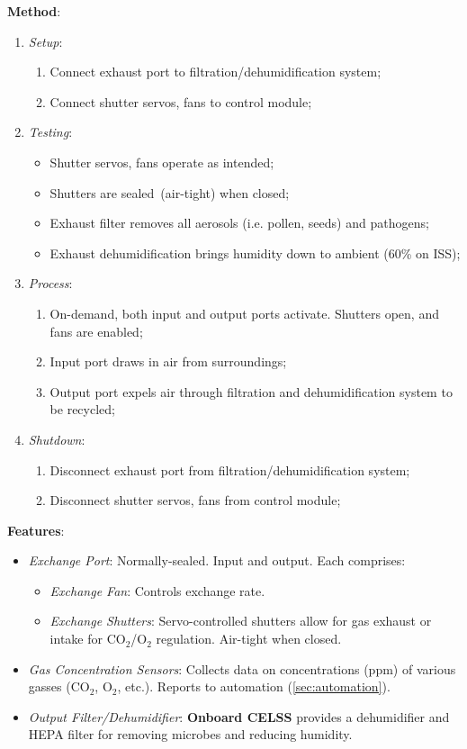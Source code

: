 \documentclass{report}
\begin{document}
\textbf{Method}:
\begin{enumerate}
    \item \textit{Setup}:
    \begin{enumerate}
        \item Connect exhaust port to filtration/dehumidification system;
        \item Connect shutter servos, fans to control module;
    \end{enumerate}
    \item \textit{Testing}:
    \begin{itemize}
        \item Shutter servos, fans operate as intended;
        \item Shutters are sealed (air-tight) when closed;
        \item Exhaust filter removes all aerosols (i.e. pollen, seeds) and pathogens;
        \item Exhaust dehumidification brings humidity down to ambient (60\% on ISS); %
    \end{itemize}
    \item \textit{Process}:
    \begin{enumerate}
        \item On-demand, both input and output ports activate. Shutters open, and fans are enabled;
        \item Input port draws in air from surroundings;
        \item Output port expels air through filtration and dehumidification system to be recycled;
    \end{enumerate}
    \item \textit{Shutdown}:
    \begin{enumerate}
        \item Disconnect exhaust port from filtration/dehumidification system;
        \item Disconnect shutter servos, fans from control module;
    \end{enumerate}
\end{enumerate}

\textbf{Features}:
\begin{itemize}
    \item \textit{Exchange Port}: Normally-sealed. Input and output. Each comprises:
    \begin{itemize}
        \item \textit{Exchange Fan}: Controls exchange rate. 
        \item \textit{Exchange Shutters}: Servo-controlled shutters allow for gas exhaust or intake for CO${}_2$/O${}_2$ regulation. Air-tight when closed.
    \end{itemize}
    \item \textit{Gas Concentration Sensors}: Collects data on concentrations (ppm) of various gasses (CO${}_2$, O${}_2$, etc.). Reports to automation (\ref{sec:automation}).
    \item \textit{Output Filter/Dehumidifier}: \textbf{Onboard CELSS} provides a dehumidifier and HEPA filter for removing microbes and reducing humidity.
\end{itemize}
\end{document}
